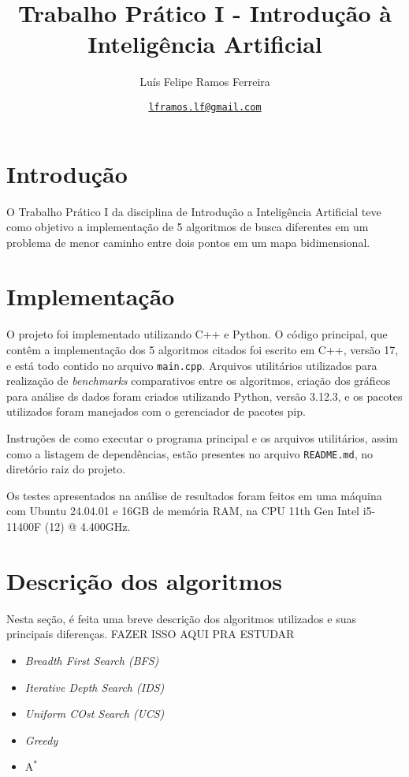 \documentclass{article}
\title{Trabalho Prático I - Introdução à Inteligência Artificial}
\author{Luís Felipe Ramos Ferreira}
\date{\href{mailto:lframos.lf@gmail.com}{\texttt{lframos.lf@gmail.com}}
}
\begin{document}
\maketitle

\section{Introdução}

O Trabalho Prático I da disciplina de Introdução a Inteligência Artificial teve como objetivo a implementação de
5 algoritmos de busca diferentes em um problema de menor caminho entre dois pontos em um mapa bidimensional.

\section{Implementação}

O projeto foi implementado utilizando C++ e Python. O código principal, que contêm a implementação dos 5 algoritmos
citados foi escrito em C++, versão 17, e está todo contido no arquivo \texttt{main.cpp}. Arquivos utilitários utilizados para
realização de \textit{benchmarks} comparativos entre os algoritmos, criação dos gráficos para análise ds dados foram criados
utilizando Python, versão 3.12.3, e os pacotes utilizados foram manejados com o gerenciador de pacotes pip.

Instruções de como executar o programa principal e os arquivos utilitários, assim como a listagem de dependências, estão
presentes no arquivo \texttt{README.md}, no diretório raiz do projeto.

Os testes apresentados na análise de resultados foram feitos em uma máquina com Ubuntu 24.04.01 e 16GB de memória RAM, na CPU
11th Gen Intel i5-11400F (12) @ 4.400GHz.

\section{Descrição dos algoritmos}

Nesta seção, é feita uma breve descrição dos algoritmos utilizados e suas principais diferenças.
FAZER ISSO AQUI PRA ESTUDAR

\begin{itemize}
	\item \textit{Breadth First Search (BFS)}
	\item \textit{Iterative Depth Search (IDS)}
	\item \textit{Uniform COst Search (UCS)}
	\item \textit{Greedy}
	\item \(\text{A}^*\)
\end{itemize}
\end{document}
